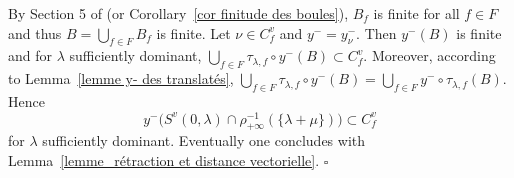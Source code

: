\documentclass[12pt]{article}
\theoremstyle{plain}
\theoremstyle{definition}
\begin{document}
By Section 5 of \cite{gaussent2014spherical} (or Corollary~\ref{cor finitude des boules}), $B_f$ is finite for all $f\in F$ and thus $B=\bigcup_{f\in F}B_f$ is finite.  Let $\nu\in C_f^v$ and $y^-=y_\nu^-$. Then $y^-(B)$ is finite and for $\lambda$ sufficiently dominant, $\bigcup_{f\in F}\tau_{\lambda,f}\circ y^-(B) \subset{C^v_f}$. Moreover, according to Lemma~\ref{lemme y- des translatés}, $\bigcup_{f\in F}\tau_{\lambda,f}\circ y^-(B)=\bigcup_{f\in F}y^-\circ \tau_{\lambda,f}(B)$. Hence \[y^-\big(S^v(0,\lambda)\cap \rho_{+\infty}^{-1}(\{\lambda+\mu\})\big)\subset C^v_f\] for $\lambda$ sufficiently dominant. Eventually one concludes with Lemma~\ref{lemme_rétraction et distance vectorielle}. $\square$




 


 
\end{document}
